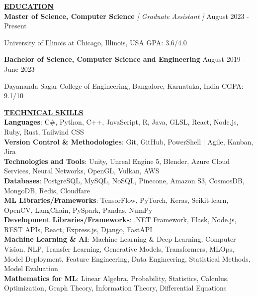 \documentclass{article}
\newlength{\remaining}
\renewcommand{\section}[1]{%
  \vspace{0.4em}\setlength{\remaining}{\textwidth-\widthof{\uppercase{#1}}}
    \noindent\underline{\fontsize{8}{13}\bfseries\uppercase{#1}\hspace*{\remaining}} \\
}
\renewcommand{\subsection}[3]{
    \noindent\textbf{#1} | \emph{#2} \hfill #3
}
\begin{document}
\renewcommand{\subsection}[3]{
    \noindent\textbf{#1}  \emph{#2} \hfill #3 \break
}

\section{Education}
\subsection{Master of Science, Computer Science}{[ Graduate Assistant ]}{August 2023 - Present}
University of Illinois at Chicago, Illinois, USA \hfill GPA: 3.6/4.0

\subsection{Bachelor of Science, Computer Science and Engineering}{}{August 2019 - June 2023}
Dayananda Sagar College of Engineering, Bangalore, Karnataka, India \hfill CGPA: 9.1/10

\section{Technical Skills}
\textbf{Languages}: C\#, Python, C++, JavaScript, R, Java, GLSL, React, Node.js, Ruby, Rust, Tailwind CSS \\
\noindent\textbf{Version Control \& Methodologies}: Git, GitHub, PowerShell |  Agile, Kanban, Jira \\
\noindent\textbf{Technologies and Tools}: Unity, Unreal Engine 5, Blender, Azure Cloud Services, Neural Networks, OpenGL, Vulkan, AWS \\
\noindent\textbf{Databases}: PostgreSQL, MySQL, NoSQL, Pinecone, Amazon S3, CosmosDB, MongoDB, Redis, Cloudfare \\
\noindent\textbf{ML Libraries/Frameworks}: TensorFlow, PyTorch, Keras, Scikit-learn, OpenCV, LangChain, PySpark, Pandas, NumPy \\
\noindent\textbf{Development Libraries/Frameworks}: .NET Framework, Flask, Node.js, REST APIs, React, Express.js, Django, FastAPI \\
\noindent\textbf{Machine Learning \& AI}: Machine Learning \& Deep Learning, Computer Vision, NLP, Transfer Learning, Generative Models, Transformers, MLOps, Model Deployment, Feature Engineering, Data Engineering, Statistical Methods, Model Evaluation \\
\noindent\textbf{Mathematics for ML}: Linear Algebra, Probability, Statistics, Calculus, Optimization, Graph Theory, Information Theory, Differential Equations \\
\end{document}
